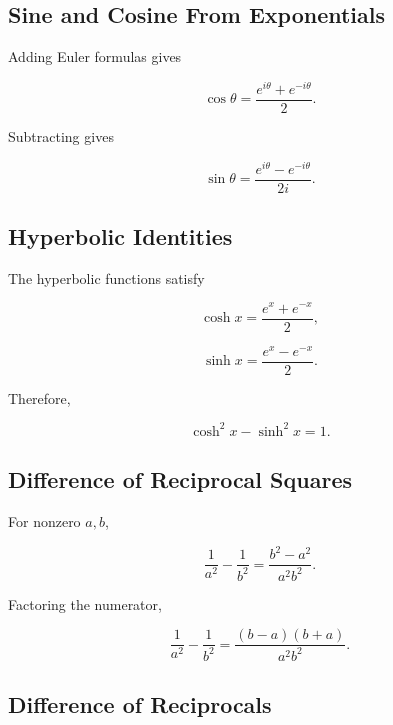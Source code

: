 \subsection{Sine and Cosine From Exponentials}
\label{subsec:sine-cosine-exponential-identities}

Adding Euler formulas gives

\[
\boxed{
\cos\theta
=
\frac{
e^{i\theta}+e^{-i\theta}
}{2}.
}
\]

Subtracting gives

\[
\boxed{
\sin\theta
=
\frac{
e^{i\theta}-e^{-i\theta}
}{
2i
}.
}
\]

\subsection{Hyperbolic Identities}
\label{subsec:hyperbolic-identities-reference}

The hyperbolic functions satisfy

\[
\boxed{
\cosh x
=
\frac{
e^x+e^{-x}
}{2},
}
\]

\[
\boxed{
\sinh x
=
\frac{
e^x-e^{-x}
}{2}.
}
\]

Therefore,

\[
\boxed{
\cosh^2x-\sinh^2x=1.
}
\]

\subsection{Difference of Reciprocal Squares}
\label{subsec:reciprocal-difference-identity}

For nonzero \(a,b\),

\[
\boxed{
\frac1{a^2}
-
\frac1{b^2}
=
\frac{
b^2-a^2
}{
a^2b^2
}.
}
\]

Factoring the numerator,

\[
\boxed{
\frac1{a^2}
-
\frac1{b^2}
=
\frac{
(b-a)(b+a)
}{
a^2b^2
}.
}
\]

\subsection{Difference of Reciprocals}
\label{subsec:difference-reciprocals}

